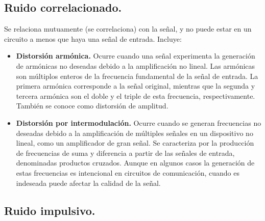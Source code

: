 \begin{justify}
\begin{itemize}
    \end{itemize}
\end{justify}

\subsection*{\fontsize{12}{18}\selectfont Ruido correlacionado.}

\begin{justify}
    Se relaciona mutuamente (se correlaciona) con la señal, y no puede estar en un circuito a menos que haya una señal de entrada. Incluye:

    \begin{itemize}
        \item \textbf{Distorsión armónica.} Ocurre cuando una señal experimenta la generación de armónicas no deseadas debido a la amplificación no lineal.
        Las armónicas son múltiplos enteros de la frecuencia fundamental de la señal de entrada. La primera armónica corresponde a la señal original, mientras que la
        segunda y tercera armónica son el doble y el triple de esta frecuencia, respectivamente. También se conoce como distorsión de amplitud.
        \item \textbf{Distorsión por intermodulación.} Ocurre cuando se generan frecuencias no deseadas debido a la amplificación de múltiples señales en un
        dispositivo no lineal, como un amplificador de gran señal. Se caracteriza por la producción de frecuencias de suma y diferencia a partir de las señales
        de entrada, denominadas productos cruzados. Aunque en algunos casos la generación de estas frecuencias es intencional en circuitos de comunicación,
        cuando es indeseada puede afectar la calidad de la señal.
    \end{itemize}
\end{justify}

\subsection*{\fontsize{12}{18}\selectfont Ruido impulsivo.}

